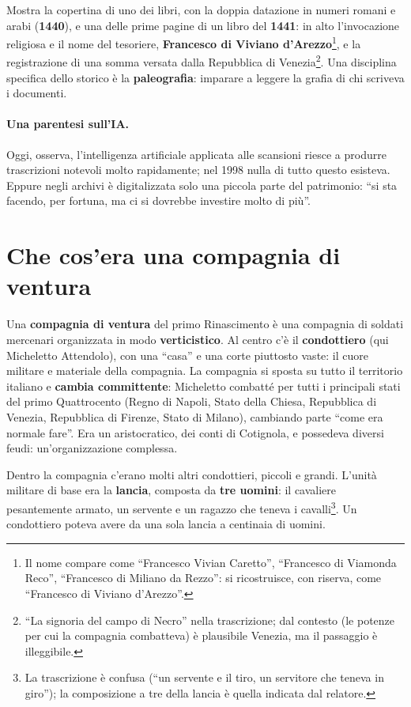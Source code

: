 Mostra la copertina di uno dei libri, con la doppia datazione in numeri romani e
arabi (\textbf{1440}), e una delle prime pagine di un libro del
\textbf{1441}: in alto l'invocazione religiosa e il nome del tesoriere,
\textbf{Francesco di Viviano d'Arezzo}\footnote{Il nome compare come ``Francesco
Vivian Caretto'', ``Francesco di Viamonda Reco'', ``Francesco di Miliano da
Rezzo'': si ricostruisce, con riserva, come ``Francesco di Viviano d'Arezzo''.},
e la registrazione di una somma versata dalla Repubblica di Venezia\footnote{``La
signoria del campo di Necro'' nella trascrizione; dal contesto (le potenze per cui
la compagnia combatteva) è plausibile Venezia, ma il passaggio è
illeggibile.}. Una disciplina specifica dello storico è la
\textbf{paleografia}: imparare a leggere la grafia di chi scriveva i documenti.

\paragraph{Una parentesi sull'IA.} Oggi, osserva, l'intelligenza artificiale
applicata alle scansioni riesce a produrre trascrizioni notevoli molto
rapidamente; nel 1998 nulla di tutto questo esisteva. Eppure negli archivi è
digitalizzata solo una piccola parte del patrimonio: ``si sta facendo, per
fortuna, ma ci si dovrebbe investire molto di più''.

\section{Che cos'era una compagnia di ventura}
\label{sec:c1-2-compagnia}

Una \textbf{compagnia di ventura} del primo Rinascimento è una compagnia di
soldati mercenari organizzata in modo \textbf{verticistico}. Al centro c'è il
\textbf{condottiero} (qui Micheletto Attendolo), con una ``casa'' e una corte
piuttosto vaste: il cuore militare e materiale della compagnia. La compagnia si
sposta su tutto il territorio italiano e \textbf{cambia committente}: Micheletto
combatté per tutti i principali stati del primo Quattrocento (Regno di Napoli,
Stato della Chiesa, Repubblica di Venezia, Repubblica di Firenze, Stato di
Milano), cambiando parte ``come era normale fare''. Era un aristocratico, dei
conti di Cotignola, e possedeva diversi feudi: un'organizzazione complessa.

Dentro la compagnia c'erano molti altri condottieri, piccoli e grandi. L'unità
militare di base era la \textbf{lancia}, composta da \textbf{tre uomini}: il
cavaliere pesantemente armato, un servente e un ragazzo che teneva i
cavalli\footnote{La trascrizione è confusa (``un servente e il tiro, un
servitore che teneva in giro''); la composizione a tre della lancia è quella
indicata dal relatore.}. Un condottiero poteva avere da una sola lancia a
centinaia di uomini.

